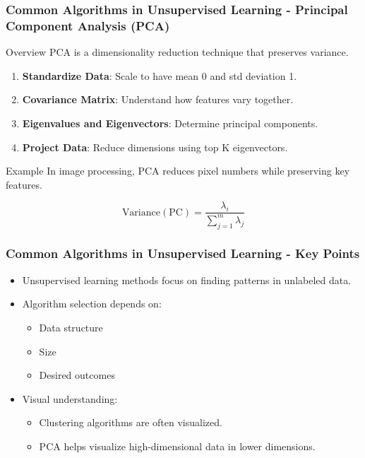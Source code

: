 \documentclass[aspectratio=169]{beamer}
\begin{document}
\begin{frame}[fragile]
    \frametitle{Common Algorithms in Unsupervised Learning - Principal Component Analysis (PCA)}
    \begin{block}{Overview}
        PCA is a dimensionality reduction technique that preserves variance.
    \end{block}

    \begin{enumerate}
        \item \textbf{Standardize Data}: Scale to have mean 0 and std deviation 1.
        \item \textbf{Covariance Matrix}: Understand how features vary together.
        \item \textbf{Eigenvalues and Eigenvectors}: Determine principal components.
        \item \textbf{Project Data}: Reduce dimensions using top K eigenvectors.
    \end{enumerate}

    \begin{block}{Example}
        In image processing, PCA reduces pixel numbers while preserving key features.
    \end{block}

    \begin{equation}
        \text{Variance}(\text{PC}) = \frac{\lambda_i}{\sum_{j=1}^{m} \lambda_j}
    \end{equation}
\end{frame}

\begin{frame}[fragile]
    \frametitle{Common Algorithms in Unsupervised Learning - Key Points}
    \begin{itemize}
        \item Unsupervised learning methods focus on finding patterns in unlabeled data.
        \item Algorithm selection depends on:
        \begin{itemize}
            \item Data structure
            \item Size
            \item Desired outcomes
        \end{itemize}
        \item Visual understanding:
        \begin{itemize}
            \item Clustering algorithms are often visualized.
            \item PCA helps visualize high-dimensional data in lower dimensions.
        \end{itemize}
    \end{itemize}
\end{frame}
\end{document}
